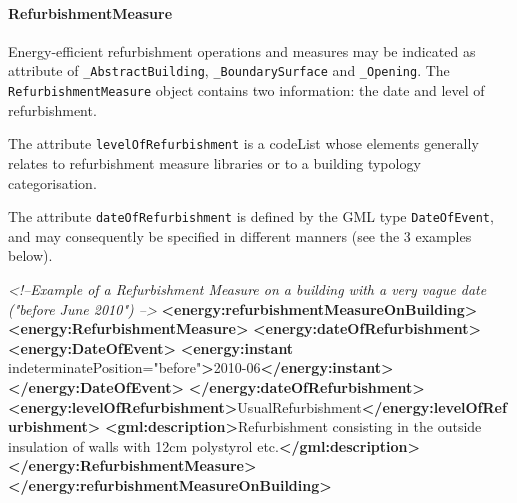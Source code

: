 \documentclass[a4paper,12pt]{article}
\newenvironment{Shaded}{}{}
\newcommand{\KeywordTok}[1]{\textcolor[rgb]{0.00,0.44,0.13}{\textbf{{#1}}}}
\newcommand{\StringTok}[1]{\textcolor[rgb]{0.25,0.44,0.63}{{#1}}}
\newcommand{\CommentTok}[1]{\textcolor[rgb]{0.38,0.63,0.69}{\textit{{#1}}}}
\newcommand{\OtherTok}[1]{\textcolor[rgb]{0.00,0.44,0.13}{{#1}}}
\newcommand{\NormalTok}[1]{{#1}}
\begin{document}
\paragraph{RefurbishmentMeasure}\label{refurbishmentmeasure}

Energy-efficient refurbishment operations and measures may be indicated
as attribute of \texttt{\_AbstractBuilding}, \texttt{\_BoundarySurface}
and \texttt{\_Opening}. The \texttt{RefurbishmentMeasure} object
contains two information: the date and level of refurbishment.

The attribute \texttt{levelOfRefurbishment} is a codeList whose elements
generally relates to refurbishment measure libraries or to a building
typology categorisation.

The attribute \texttt{dateOfRefurbishment} is defined by the GML type
\texttt{DateOfEvent}, and may consequently be specified in different
manners (see the 3 examples below).

\begin{Shaded}
\begin{Highlighting}[]
\CommentTok{<!--Example of a Refurbishment Measure on a building with a very vague date ("before June 2010") -->}
\KeywordTok{<energy:refurbishmentMeasureOnBuilding>}
    \KeywordTok{<energy:RefurbishmentMeasure>}
        \KeywordTok{<energy:dateOfRefurbishment>}
            \KeywordTok{<energy:DateOfEvent>}
                \KeywordTok{<energy:instant}\OtherTok{ indeterminatePosition=}\StringTok{"before"}\KeywordTok{>}\NormalTok{2010-06}\KeywordTok{</energy:instant>}
            \KeywordTok{</energy:DateOfEvent>}
        \KeywordTok{</energy:dateOfRefurbishment>}
        \KeywordTok{<energy:levelOfRefurbishment>}\NormalTok{UsualRefurbishment}\KeywordTok{</energy:levelOfRefurbishment>}
        \KeywordTok{<gml:description>}\NormalTok{Refurbishment consisting in the outside insulation of walls with 12cm polystyrol etc.}\KeywordTok{</gml:description>}
    \KeywordTok{</energy:RefurbishmentMeasure>}
\KeywordTok{</energy:refurbishmentMeasureOnBuilding>}
\end{Highlighting}
\end{Shaded}
\end{document}
